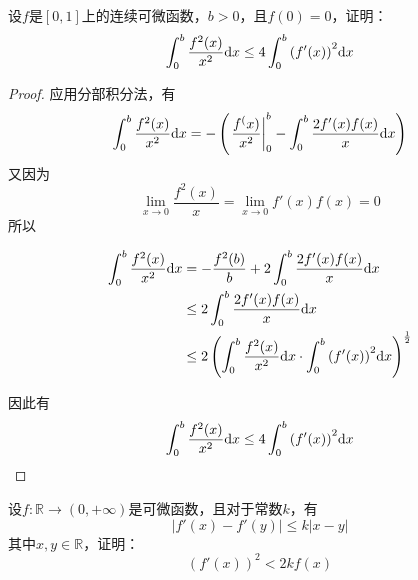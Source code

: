 \begin{proposition}

    设$f$是$[0,1]$上的连续可微函数，$b > 0$，且$f(0) = 0$，证明：
    $$\int_{0}^{b}{\dfrac{f^2(x)}{x^2}}\mathrm{d} x \leq 4\int_{0}^{b}{\left( f'(x)\right)^2 }\mathrm{d} x $$

\end{proposition}

\begin{proof}

    应用分部积分法，有
    $$\int_{0}^{b}{\dfrac{f^2(x)}{x^2}}\mathrm{d} x = - \left( \left.\dfrac{f^(x)}{x^2} \right|_{0}^{b} - \int_{0}^{b}{\dfrac{2f'(x)f(x)}{x}}\mathrm{d} x \right)$$
    又因为
    $$\lim_{x \to 0}{\dfrac{f^2(x)}{x}} = \lim_{x \to 0}{f'(x)f(x)} = 0$$
    所以

    \begin{align*}
        \int_{0}^{b}{\dfrac{f^2(x)}{x^2}}\mathrm{d} x &= -\dfrac{f^2(b)}{b} + 2 \int_{0}^{b}{\dfrac{2f'(x)f(x)}{x}}\mathrm{d} x \\
        & \leq 2\int_{0}^{b}{\dfrac{2f'(x)f(x)}{x}}\mathrm{d} x \\
        & \leq 2\left( \int_{0}^{b}{\dfrac{f^2(x)}{x^2}}\mathrm{d} x \cdot \int_{0}^{b}{\left(f'(x)\right)^2}\mathrm{d} x\right)^{\frac{1}{2}}
    \end{align*}

    因此有
    $$\int_{0}^{b}{\dfrac{f^2(x)}{x^2}}\mathrm{d} x \leq 4\int_{0}^{b}{\left( f'(x)\right)^2 }\mathrm{d} x $$

\end{proof}

\begin{proposition}

    设$f:\mathbb{R} \to (0 ,+\infty)$是可微函数，且对于常数$k$，有
    $$|f'(x) - f'(y)| \leq k|x - y|$$
    其中$x,y \in \mathbb{R}$，证明：
    $$\left( f'(x) \right)^2 < 2kf(x)$$

\end{proposition}

